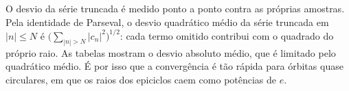 O desvio da série truncada é medido ponto a ponto contra as próprias amostras. Pela identidade de Parseval, o desvio quadrático médio da série truncada em $|n|\leq N$ é $\bigl(\sum_{|n|>N}|c_n|^2\bigr)^{1/2}$: cada termo omitido contribui com o quadrado do próprio raio. As tabelas mostram o desvio absoluto médio, que é limitado pelo quadrático médio. É por isso que a convergência é tão rápida para órbitas quase circulares, em que os raios dos epiciclos caem como potências de $e$.
